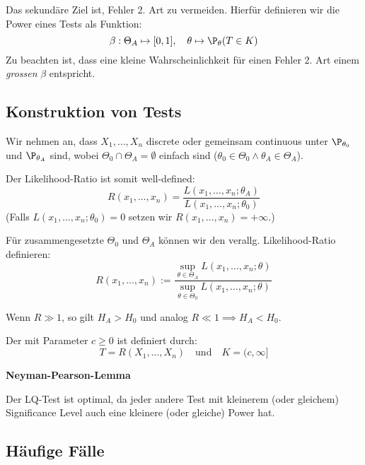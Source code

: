Das sekundäre Ziel ist, Fehler 2. Art zu vermeiden. Hierfür definieren wir die Power eines Tests als Funktion:
\[\beta : \Theta_A \mapsto [0,1], \quad \theta \mapsto \P_\theta(T \in K)\]
Zu beachten ist, dass eine kleine Wahrscheinlichkeit für einen Fehler 2. Art einem \textit{grossen} \(\beta\) entspricht.

\subsection{Konstruktion von Tests}
Wir nehmen an, dass \(X_1, \ldots, X_n\) discrete oder gemeinsam continuous unter \(\P_{\theta_0}\) und \(\P_{\theta_A}\) sind, wobei \(\Theta_0 \cap \Theta_A = \emptyset\) einfach sind (\(\theta_0 \in \Theta_0 \land \theta_A \in \Theta_A\)).

\noindent Der Likelihood-Ratio ist somit well-defined:
\[R(x_1, \ldots, x_n) = \frac{L(x_1,\ldots, x_n;\theta_A)}{L(x_1, \ldots, x_n;\theta_0)}\]
(Falls \(L(x_1, \ldots, x_n; \theta_0) = 0\) setzen wir \(R(x_1, \ldots, x_n) = +\infty\).) 

Für zusammengesetzte $\Theta_0$ und $\Theta_A$ können wir den verallg. Likelihood-Ratio definieren:
\[R(x_1, ..., x_n) := \frac{\sup_{\theta \in \Theta_A}L(x_1, \dots, x_n; \theta)}{\sup_{\theta \in \Theta_0}L(x_1, \dots, x_n; \theta)}\]


Wenn \(R \gg 1\), so gilt \(H_A > H_0\) und analog \(R \ll 1 \implies H_A < H_0\).

\begin{subbox}{}
	Der  mit Parameter \(c \ge 0\) ist definiert durch:
	\[T = R(X_1, \ldots, X_n) \quad \text{und} \quad K = (c, \infty]\]
\end{subbox}
\textbf{Neyman-Pearson-Lemma}

Der LQ-Test ist optimal, da jeder andere Test mit kleinerem (oder gleichem) Significance Level auch eine kleinere (oder gleiche) Power hat.

\subsection{Häufige Fälle}

